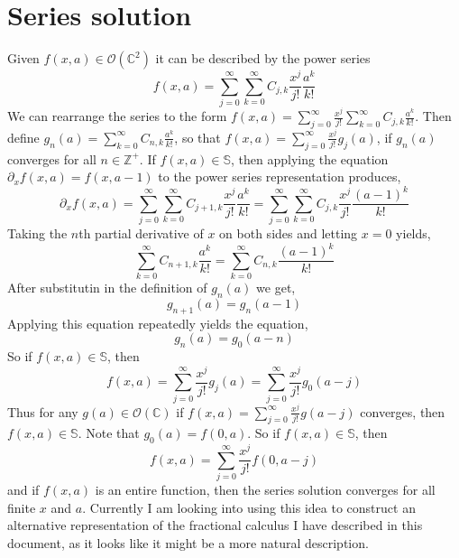\documentclass[%
 onecolumn,
 amsmath, amssymb, aps, pra, 10pt
]{revtex4-2}
\begin{document}
\section*{Series solution}
Given $f(x, a) \in \mathcal{O}(\mathbb{C}^2)$ it can be described by the power series
$$f(x, a) = \sum_{j=0}^{\infty} \sum_{k=0}^{\infty} C_{j, k} \frac{x^j}{j!} \frac{a^k}{k!}$$
We can rearrange the series to the form $f(x, a) = \sum_{j=0}^{\infty} \frac{x^j}{j!} \sum_{k=0}^{\infty} C_{j, k} \frac{a^k}{k!}$. Then define $g_n(a) = \sum_{k=0}^{\infty} C_{n, k} \frac{a^k}{k!}$, so that $f(x, a) = \sum_{j=0}^{\infty} \frac{x^j}{j!} g_j(a)$, if $g_n(a)$ converges for all $n \in \mathbb{Z}^+$. If $f(x, a) \in \mathbb{S}$, then applying the equation $\partial_x f(x, a) = f(x, a - 1)$ to the power series representation produces,
$$\partial_x f(x, a) = \sum_{j=0}^{\infty} \sum_{k=0}^{\infty} C_{j + 1, k} \frac{x^j}{j!} \frac{a^k}{k!} = \sum_{j=0}^{\infty} \sum_{k=0}^{\infty} C_{j, k} \frac{x^j}{j!} \frac{(a - 1)^k}{k!}$$
Taking the $n$th partial derivative of $x$ on both sides and letting $x=0$ yields,
$$\sum_{k=0}^{\infty} C_{n + 1, k} \frac{a^k}{k!} = \sum_{k=0}^{\infty} C_{n, k} \frac{(a -1)^k}{k!}$$
After substitutin in the definition of $g_n(a)$ we get,
$$g_{n+1}(a) = g_{n}(a - 1)$$
Applying this equation repeatedly yields the equation,
$$g_{n}(a) = g_{0}(a - n)$$
So if $f(x, a) \in \mathbb{S}$, then
$$f(x, a) = \sum_{j=0}^{\infty} \frac{x^j}{j!} g_{j}(a) = \sum_{j=0}^{\infty} \frac{x^j}{j!} g_{0}(a - j)$$
Thus for any $g(a) \in \mathcal{O}(\mathbb{C})$ if $f(x, a) = \sum_{j=0}^{\infty} \frac{x^j}{j!} g(a - j)$ converges, then $f(x, a) \in \mathbb{S}$. Note that $g_{0}(a) = f(0, a)$. So if $f(x, a) \in \mathbb{S}$, then 
\begin{equation}
f(x, a) = \sum_{j=0}^{\infty} \frac{x^j}{j!} f(0, a - j)
\label{series_solution}
\end{equation}
and if $f(x, a)$ is an entire function, then the series solution converges for all finite $x$ and $a$. Currently I am looking into using this idea to construct an alternative representation of the fractional calculus I have described in this document, as it looks like it might be a more natural description.



\end{document}
